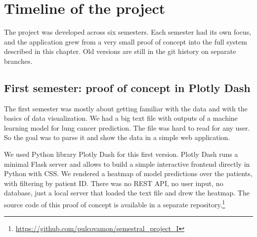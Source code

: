 %
%

\section{Timeline of the project}
\label{sec:results-timeline}

The project was developed across six semesters. Each semester had its own focus, and the application grew from a very small proof of concept into the full system described in this chapter. Old versions are still in the git history on separate branches.

\subsection{First semester: proof of concept in Plotly Dash}
\label{sec:results-timeline-s1}

The first semester was mostly about getting familiar with the data and with the basics of data visualization. We had a big text file with outputs of a machine learning model for lung cancer prediction. The file was hard to read for any user. So the goal was to parse it and show the data in a simple web application.

We used Python library Plotly Dash for this first version. Plotly Dash runs a minimal Flask server and allows to build a simple interactive frontend directly in Python with CSS. We rendered a heatmap of model predictions over the patients, with filtering by patient ID. There was no REST API, no user input, no database, just a local server that loaded the text file and drew the heatmap. The source code of this proof of concept is available in a separate repository.\footnote{\url{https://github.com/pulcovamon/semestral\_project\_I}}


